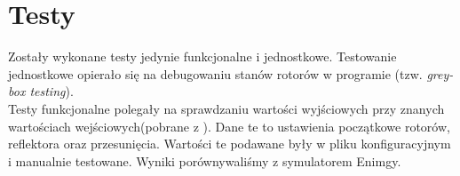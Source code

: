 \documentclass[11pt,a4paper,polish]{article}
\begin{document}
\section{Testy}
Zostały wykonane testy jedynie funkcjonalne i jednostkowe. Testowanie
jednostkowe opierało się na debugowaniu stanów rotorów w programie (tzw.
\textit{grey-box testing}).\\
Testy funkcjonalne polegały na sprawdzaniu wartości wyjściowych przy znanych
wartościach wejściowych(pobrane z \cite{wiki, Hamer}).
Dane te to ustawienia początkowe rotorów, reflektora oraz przesunięcia. Wartości
te podawane były w pliku konfiguracyjnym i manualnie testowane. Wyniki
porównywaliśmy z symulatorem Enimgy\cite{enigmatut}.






\end{document}
